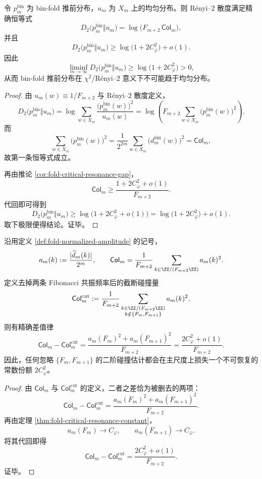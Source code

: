 \begin{theorem}\label{thm:xi-time-part9p-renyi2-obstruction}
令 \(p_m^{\mathrm{bin}}\) 为 bin-fold 推前分布，\(u_m\) 为 \(X_m\) 上的均匀分布。则 Rényi--\(2\) 散度满足精确恒等式
\[
D_2\bigl(p_m^{\mathrm{bin}}\Vert u_m\bigr)
=
\log\!\bigl(F_{m+2}\,\mathsf{Col}_m\bigr),
\]
并且
\[
D_2\bigl(p_m^{\mathrm{bin}}\Vert u_m\bigr)
\ge
\log\!\bigl(1+2C_\varphi^2\bigr)+o(1).
\]
因此
\[
\liminf_{m\to\infty}D_2\bigl(p_m^{\mathrm{bin}}\Vert u_m\bigr)
\ge
\log\!\bigl(1+2C_\varphi^2\bigr)
>
0,
\]
从而 bin-fold 推前分布在 \(\chi^2\)/Rényi--\(2\) 意义下不可能趋于均匀分布。
\end{theorem}
\begin{proof}
由 \(u_m(w)\equiv 1/F_{m+2}\) 与 Rényi--\(2\) 散度定义，
\[
D_2\bigl(p_m^{\mathrm{bin}}\Vert u_m\bigr)
=
\log\sum_{w\in X_m}\frac{\bigl(p_m^{\mathrm{bin}}(w)\bigr)^2}{u_m(w)}
=
\log\!\left(F_{m+2}\sum_{w\in X_m}\bigl(p_m^{\mathrm{bin}}(w)\bigr)^2\right).
\]
而
\[
\sum_{w\in X_m}\bigl(p_m^{\mathrm{bin}}(w)\bigr)^2
=
\frac{1}{2^{2m}}\sum_{w\in X_m}\bigl(d_m^{\mathrm{bin}}(w)\bigr)^2
=
\mathsf{Col}_m,
\]
故第一条恒等式成立。

再由推论 \ref{cor:fold-critical-resonance-gap}，
\[
\mathsf{Col}_m
\ge
\frac{1+2C_\varphi^2+o(1)}{F_{m+2}}.
\]
代回即可得到
\[
D_2\bigl(p_m^{\mathrm{bin}}\Vert u_m\bigr)
\ge
\log\!\bigl(1+2C_\varphi^2+o(1)\bigr)
=
\log\!\bigl(1+2C_\varphi^2\bigr)+o(1).
\]
取下极限便得结论。证毕。
\end{proof}

\begin{proposition}\label{prop:xi-time-part9p-fibonacci-resonance-cut-collision}
沿用定义 \ref{def:fold-normalized-amplitude} 的记号，
\[
a_m(k):=\frac{|\widehat d_m(k)|}{2^m},
\qquad
\mathsf{Col}_m=\frac{1}{F_{m+2}}\sum_{k\in\ZZ/(F_{m+2}\ZZ)}a_m(k)^2.
\]
定义去掉两条 Fibonacci 共振频率后的截断碰撞量
\[
\mathsf{Col}_m^{\mathrm{cut}}
:=
\frac{1}{F_{m+2}}
\sum_{\substack{k\in\ZZ/(F_{m+2}\ZZ)\\ k\notin\{F_m,F_{m+1}\}}}
a_m(k)^2.
\]
则有精确差值律
\[
\mathsf{Col}_m-\mathsf{Col}_m^{\mathrm{cut}}
=
\frac{a_m(F_m)^2+a_m(F_{m+1})^2}{F_{m+2}}
=
\frac{2C_\varphi^2+o(1)}{F_{m+2}}.
\]
因此，任何忽略 \(\{F_m,F_{m+1}\}\) 的二阶碰撞估计都会在主尺度上损失一个不可恢复的常数份额 \(2C_\varphi^2\)。
\end{proposition}
\begin{proof}
由 \(\mathsf{Col}_m\) 与 \(\mathsf{Col}_m^{\mathrm{cut}}\) 的定义，二者之差恰为被删去的两项：
\[
\mathsf{Col}_m-\mathsf{Col}_m^{\mathrm{cut}}
=
\frac{a_m(F_m)^2+a_m(F_{m+1})^2}{F_{m+2}}.
\]
再由定理 \ref{thm:fold-critical-resonance-constant}，
\[
a_m(F_m)\to C_\varphi,
\qquad
a_m(F_{m+1})\to C_\varphi.
\]
将其代回即得
\[
\mathsf{Col}_m-\mathsf{Col}_m^{\mathrm{cut}}
=
\frac{2C_\varphi^2+o(1)}{F_{m+2}}.
\]
证毕。
\end{proof}

